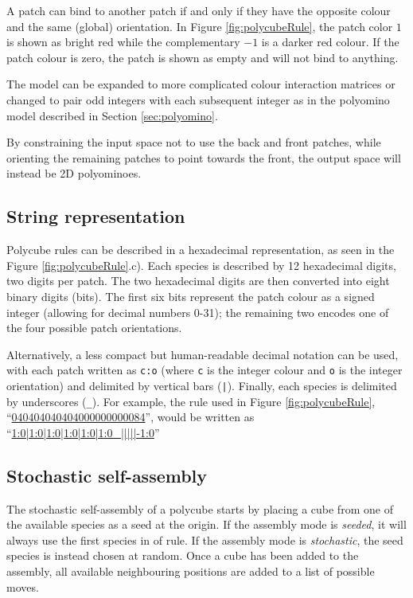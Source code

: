 A patch can bind to another patch if and only if they have the opposite colour and the same (global) orientation. In Figure \ref{fig:polycubeRule}, the patch color \(1\) is shown as bright red while the complementary \(-1\) is a darker red colour.  If the patch colour is zero, the patch is shown as empty and will not bind to anything.

The model can be expanded to more complicated colour interaction matrices or changed to pair odd integers with each subsequent integer as in the polyomino model \cite{ahnert2010self,johnston2011evolutionary} described in Section \ref{sec:polyomino}.

By constraining the input space not to use the back and front patches, while orienting the remaining patches to point towards the front, the output space will instead be 2D polyominoes.

\subsection{String representation}

Polycube rules can be described in a hexadecimal representation, as seen in the Figure \ref{fig:polycubeRule}.c). Each species is described by 12 hexadecimal digits, two digits per patch. The two hexadecimal digits are then converted into eight binary digits (bits). The first six bits represent the patch colour as a signed integer (allowing for decimal numbers 0-31); the remaining two encodes one of the four possible patch orientations.

Alternatively, a less compact but human-readable decimal notation can be used, with each patch written as \texttt{c:o} (where \texttt{c} is the integer colour and \texttt{o} is the integer orientation) and delimited by vertical bars (\texttt{|}). Finally, each species is delimited by underscores (\texttt{\_}). For example, the rule used in Figure \ref{fig:polycubeRule}, ``\href{https://akodiat.github.io/polycubes?rule=040404040404000000000084}{040404040404000000000084}'', would be written as ``\href{https://akodiat.github.io/polycubes?decRule=1:0|1:0|1:0|1:0|1:0|1:0_|||||-1:0}{1:0|1:0|1:0|1:0|1:0|1:0\_|||||-1:0}''

\subsection{Stochastic self-assembly}

The stochastic self-assembly of a polycube starts by placing a cube from one of the available species as a seed at the origin. If the assembly mode is \emph{seeded}, it will always use the first species in of rule. If the assembly mode is \emph{stochastic}, the seed species is instead chosen at random. Once a cube has been added to the assembly, all available neighbouring positions are added to a list of possible moves.

